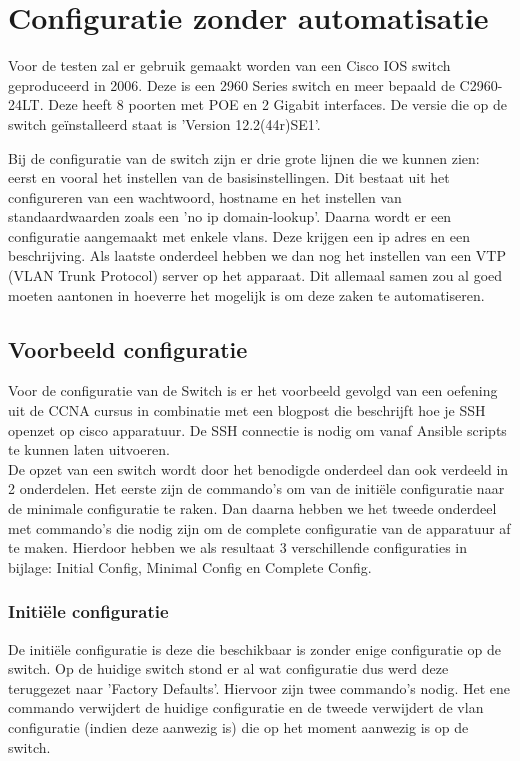 
\chapter{Configuratie zonder automatisatie}
\label{ch:configuratie}

Voor de testen zal er gebruik gemaakt worden van een Cisco IOS switch geproduceerd in 2006. Deze is een 2960 Series switch en meer bepaald de C2960-24LT. Deze heeft 8 poorten met POE en 2 Gigabit interfaces. De versie die op de switch geïnstalleerd staat is 'Version 12.2(44r)SE1'.

Bij de configuratie van de switch zijn er drie grote lijnen die we kunnen zien: eerst en vooral het instellen van de basisinstellingen. Dit bestaat uit het configureren van een wachtwoord, hostname en het instellen van standaardwaarden zoals een 'no ip domain-lookup'.
Daarna wordt er een configuratie aangemaakt met enkele vlans. Deze krijgen een ip adres en een beschrijving. Als laatste onderdeel hebben we dan nog het instellen van een VTP (VLAN Trunk Protocol) server op het apparaat. Dit allemaal samen zou al goed moeten aantonen in hoeverre het mogelijk is om deze zaken te automatiseren.

\section{Voorbeeld configuratie}
\label{sec:voorbeeld}
Voor de configuratie van de Switch is er het voorbeeld gevolgd van een oefening uit de CCNA cursus in combinatie met een blogpost die beschrijft hoe je SSH openzet op cisco apparatuur. De SSH connectie is nodig om vanaf Ansible scripts te kunnen laten uitvoeren. 
\\
De opzet van een switch wordt door het benodigde onderdeel dan ook verdeeld in 2 onderdelen. Het eerste zijn de commando's om van de initiële configuratie naar de minimale configuratie te raken. Dan daarna hebben we het tweede onderdeel met commando's die nodig zijn om de complete configuratie van de apparatuur af te maken. Hierdoor hebben we als resultaat 3 verschillende configuraties in bijlage: Initial Config, Minimal Config en Complete Config. 

\subsection{Initiële configuratie}
\label{sec:initiële configuratie}
De initiële configuratie is deze die beschikbaar is zonder enige configuratie op de switch. Op de huidige switch stond er al wat configuratie dus werd deze teruggezet naar 'Factory Defaults'. Hiervoor zijn twee commando's nodig. Het ene commando verwijdert de huidige configuratie en de tweede verwijdert de vlan configuratie (indien deze aanwezig is) die op het moment aanwezig is op de switch. \autocite{resetSwitch}
\\

